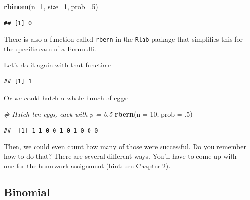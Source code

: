 \documentclass[
]{book}
\newenvironment{Shaded}{\begin{snugshade}}{\end{snugshade}}
\newcommand{\CommentTok}[1]{\textcolor[rgb]{0.56,0.35,0.01}{\textit{#1}}}
\newcommand{\DataTypeTok}[1]{\textcolor[rgb]{0.13,0.29,0.53}{#1}}
\newcommand{\DecValTok}[1]{\textcolor[rgb]{0.00,0.00,0.81}{#1}}
\newcommand{\FloatTok}[1]{\textcolor[rgb]{0.00,0.00,0.81}{#1}}
\newcommand{\KeywordTok}[1]{\textcolor[rgb]{0.13,0.29,0.53}{\textbf{#1}}}
\newcommand{\NormalTok}[1]{#1}
\begin{document}
\begin{Shaded}
\begin{Highlighting}[]
\KeywordTok{rbinom}\NormalTok{(}\DataTypeTok{n=}\DecValTok{1}\NormalTok{, }\DataTypeTok{size=}\DecValTok{1}\NormalTok{, }\DataTypeTok{prob=}\NormalTok{.}\DecValTok{5}\NormalTok{)}
\end{Highlighting}
\end{Shaded}

\begin{verbatim}
## [1] 0
\end{verbatim}

There is also a function called \texttt{rbern} in the \texttt{Rlab} package that simplifies this for the specific case of a Bernoulli.

Let's do it again with that function:

\begin{Shaded}
\end{Shaded}

\begin{verbatim}
## [1] 1
\end{verbatim}

Or we could hatch a whole bunch of eggs:

\begin{Shaded}
\begin{Highlighting}[]
\CommentTok{# Hatch ten eggs, each with p = 0.5}
\KeywordTok{rbern}\NormalTok{(}\DataTypeTok{n =} \DecValTok{10}\NormalTok{, }\DataTypeTok{prob =} \FloatTok{.5}\NormalTok{)}
\end{Highlighting}
\end{Shaded}

\begin{verbatim}
##  [1] 1 1 0 0 1 0 1 0 0 0
\end{verbatim}

Then, we could even count how many of those were successful. Do you remember how to do that? There are several different ways. You'll have to come up with one for the homework assignment (hint: see \protect\hyperlink{Chapter2}{Chapter 2}).

\hypertarget{binomial}{%
\subsection{Binomial}\label{binomial}}
\end{document}
